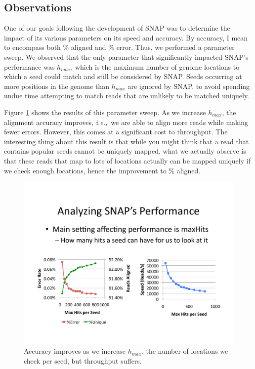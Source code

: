 \documentclass[twocolumn,10pt]{article}
\newcommand{\ie}{{\em i.e.,}~}
\begin{document}
\subsection{Observations}

One of our goals following the development of SNAP was to determine the impact of its various parameters on its speed and accuracy.  By accuracy, I mean to encompass both \% aligned and \% error.  Thus, we performed a parameter sweep.  We observed that the only parameter that significantly impacted SNAP's performance was \(h_{max}\), which is the maximum number of genome locations to which a seed could match and still be considered by SNAP.  Seeds occurring at more positions in the genome than \(h_{max}\) are ignored by SNAP, to avoid spending undue time attempting to match reads that are unlikely to be matched uniquely.

Figure \ref{fig:maxHits} shows the results of this parameter sweep.  As we increase \(h_{max}\), the alignment accuracy improves, \ie we are able to align more reads while making fewer errors.  However, this comes at a significant cost to throughput.  The interesting thing about this result is that while you might think that a read that contains popular seeds cannot be uniquely mapped, what we actually observe is that these reads that map to lots of locations actually can be mapped uniquely if we check enough locations, hence the improvement to \% aligned.

\begin{figure}
\centering
\includegraphics[scale=0.6]{maxHits.pdf}
\caption{Accuracy improves as we increase \(h_{max}\), the number of locations we check per seed, but throughput suffers.}
\label{fig:maxHits}
\end{figure}
\end{document}
